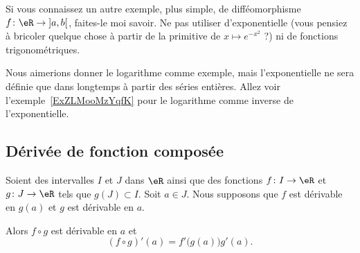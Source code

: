 \begin{probleme}
Si vous connaissez un autre exemple, plus simple, de difféomorphisme \( f\colon \eR\to \mathopen] a , b \mathclose[\), faites-le moi savoir. Ne pas utiliser d'exponentielle (vous pensiez à bricoler quelque chose à partir de la primitive de \( x\mapsto  e^{-x^2}\) ?) ni de fonctions trigonométriques.
\end{probleme}

\begin{example}
    Nous aimerions donner le logarithme comme exemple, mais l'exponentielle ne sera définie que dans longtemps à partir des séries entières. Allez voir l'exemple~\ref{ExZLMooMzYqfK} pour le logarithme comme inverse de l'exponentielle.
\end{example}

\subsection{Dérivée de fonction composée}

\begin{proposition}       \label{PROPooDONLooWthqRR}
    Soient des intervalles \( I\) et \( J\) dans \( \eR\) ainsi que des fonctions \( f\colon I\to \eR\) et \( g\colon J\to \eR\) tels que \( g(J)\subset I\). Soit \( a\in J\). Nous supposons que \( f\) est dérivable en \( g(a)\) et \( g\) est dérivable en \( a\).

    Alors \( f\circ g\) est dérivable en \( a\) et
    \begin{equation}
        (f\circ g)'(a)=f'\big( g(a) \big)g'(a).
    \end{equation}
\end{proposition}

